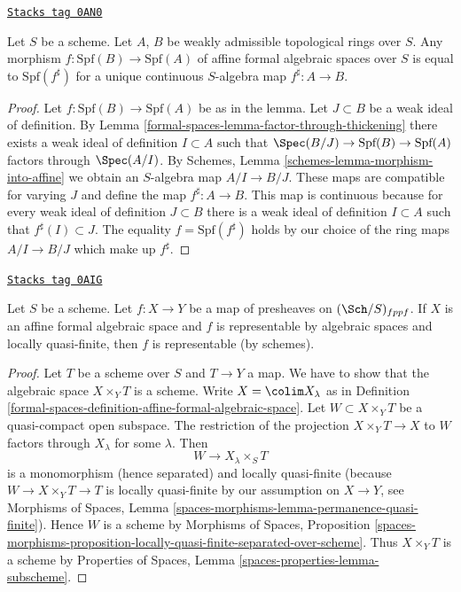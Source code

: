 \begin{lemma}
\label{formal-spaces-lemma-morphism-between-formal-spectra}
\href{https://stacks.math.columbia.edu/tag/0AN0}{\texttt{Stacks tag 0AN0}}

Let $S$ be a scheme. Let $A$, $B$ be weakly admissible
topological rings over $S$. Any morphism $f : \text{Spf}(B) \to \text{Spf}(A)$
of affine formal algebraic spaces over $S$
is equal to $\text{Spf}(f^\sharp)$ for a unique continuous
$S$-algebra map $f^\sharp : A \to B$.
\end{lemma}

\begin{proof}
Let $f : \text{Spf}(B) \to \text{Spf}(A)$ be as in the lemma.
Let $J \subset B$ be a weak ideal of definition. By
Lemma \ref{formal-spaces-lemma-factor-through-thickening}
there exists a weak ideal of definition $I \subset A$ such that
$\Spec(B/J) \to \text{Spf}(B) \to \text{Spf}(A)$
factors through $\Spec(A/I)$. By
Schemes, Lemma \ref{schemes-lemma-morphism-into-affine}
we obtain an $S$-algebra map $A/I \to B/J$.
These maps are compatible for varying $J$ and define the
map $f^\sharp : A \to B$. This map is continuous because
for every weak ideal of definition $J \subset B$ there is a
weak ideal of definition $I \subset A$ such that
$f^\sharp(I) \subset J$. The equality $f = \text{Spf}(f^\sharp)$
holds by our choice of the ring maps $A/I \to B/J$ which make up $f^\sharp$.
\end{proof}

\begin{lemma}
\label{formal-spaces-lemma-presentation-representable}
\href{https://stacks.math.columbia.edu/tag/0AIG}{\texttt{Stacks tag 0AIG}}

Let $S$ be a scheme. Let $f : X \to Y$ be a map
of presheaves on $(\Sch/S)_{fppf}$. If $X$ is an affine formal algebraic
space and $f$ is representable by algebraic spaces and locally quasi-finite,
then $f$ is representable (by schemes).
\end{lemma}

\begin{proof}
Let $T$ be a scheme over $S$ and $T \to Y$ a map. We have to show that
the algebraic space $X \times_Y T$ is a scheme. Write $X = \colim X_\lambda$
as in Definition
\ref{formal-spaces-definition-affine-formal-algebraic-space}.
Let $W \subset X \times_Y T$
be a quasi-compact open subspace. The restriction of the projection
$X \times_Y T \to X$ to $W$ factors through $X_\lambda$ for some $\lambda$.
Then
$$
W \to X_\lambda \times_S T
$$
is a monomorphism (hence separated) and locally quasi-finite (because
$W \to X \times_Y T \to T$ is locally quasi-finite by our assumption
on $X \to Y$, see Morphisms of Spaces, Lemma
\ref{spaces-morphisms-lemma-permanence-quasi-finite}).
Hence $W$ is a scheme by
Morphisms of Spaces, Proposition
\ref{spaces-morphisms-proposition-locally-quasi-finite-separated-over-scheme}.
Thus $X \times_Y T$ is a scheme by
Properties of Spaces, Lemma \ref{spaces-properties-lemma-subscheme}.
\end{proof}

